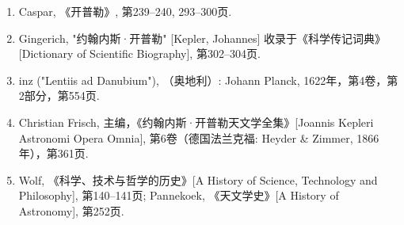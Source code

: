 \begin{enumerate}
\item Caspar, 《开普勒》, 第239–240, 293–300页.
\item Gingerich, "约翰内斯·开普勒" [Kepler, Johannes] 收录于《科学传记词典》[Dictionary of Scientific Biography], 第302–304页.
\item inz ("Lentiis ad Danubium"), （奥地利）: Johann Planck, 1622年，第4卷，第2部分，第554页.
\item Christian Frisch, 主编，《约翰内斯·开普勒天文学全集》[Joannis Kepleri Astronomi Opera Omnia], 第6卷（德国法兰克福: Heyder & Zimmer, 1866年），第361页.
\item Wolf, 《科学、技术与哲学的历史》[A History of Science, Technology and Philosophy], 第140–141页; Pannekoek, 《天文学史》[A History of Astronomy], 第252页.
\end{enumerate}